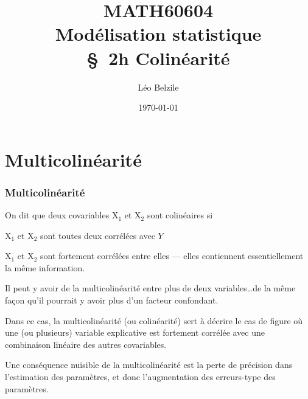 \documentclass[xcolor={dvipsnames}]{beamer}
\title[\color{white}{MATH60604 \S~2h Colinéarité}]{MATH60604 \\Modélisation statistique \\ \S~2h Colinéarité}
\author{Léo Belzile}
\date{\today}
\institute{HEC Montréal\\
Département de sciences de la décision}
\date{}
\begin{document}
\frame{\titlepage}
\section{Multicolinéarité}

\begin{frame}
\frametitle{Multicolinéarité}
\bi
\item On dit que deux covariables $\mathrm{X}_1$ et $\mathrm{X}_2$ sont \alert{colinéaires} si
\bi
\item $\mathrm{X}_1$ et $\mathrm{X}_2$ sont toutes deux corrélées avec $Y$
\item $\mathrm{X}_1$ et $\mathrm{X}_2$ sont fortement corrélées entre elles --- elles contiennent essentiellement la même information.
\ei
\item Il peut y avoir de la multicolinéarité entre plus de deux variables\ldots de la même façon qu'il pourrait y avoir plus d'un facteur confondant.
\item Dans ce cas, la \alert{multicolinéarité} (ou  colinéarité) sert à décrire le cas de figure où une (ou plusieurs) variable explicative est fortement corrélée avec une combinaison linéaire des autres covariables.
\item Une conséquence nuisible de la multicolinéarité est la \alert{perte de précision} dans l'estimation des paramètres, et donc l'augmentation des erreurs-type des paramètres. 
\ei
\end{frame}
\end{document}
